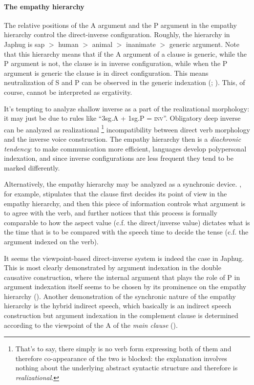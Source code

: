 \documentclass[a4paper, oneside, 12pt]{report}
\newcommand*{\textgt}{$>$ }
\newcommand*{\citesec}[1]{\S~{#1}}
\newcommand{\category}[1]{\textsc{#1}}
\begin{document}
\paragraph*{The empathy hierarchy}\label{sec:grammatical.clause.direct-inverse.hierarchy} 
The relative positions of the A argument and the P argument in the empathy hierarchy
control the direct-inverse configuration.
Roughly, the hierarchy in Japhug is 
\ac{sap} \textgt human \textgt animal \textgt inanimate \textgt generic argument.
Note that this hierarchy means that
if the A argument of a clause is generic,
while the P argument is not,
the clause is in inverse configuration,
while when the P argument is generic the clause is in direct configuration.
This means neutralization of S and P can be observed in the generic indexation
(\citealt{jacques2012argument}; \citealt[\citesec{14.3.2.5}]{jacques2021grammar}).
This, of course, cannot be interpreted as ergativity.

It's tempting to analyze shallow inverse as 
a part of the realizational morphology:
it may just be due to rules like ``3sg.A + 1sg.P = \category{inv}''. 
Obligatory deep inverse can be analyzed as realizational%
\footnote{
    That's to say, there simply is no verb form expressing both of them
    and therefore co-appearance of the two is blocked:
    the explanation involves nothing about the underlying abstract syntactic structure 
    and therefore is \emph{realizational}.
}
incompatibility between
direct verb morphology and the inverse voice construction.
The empathy hierarchy then is a \emph{diachronic tendency}:
to make communication more efficient,
languages develop polypersonal indexation, 
and since inverse configurations are less frequent they tend to be marked differently.

Alternatively, the empathy hierarchy may be analyzed as a synchronic device. 
\citet[\citesec{7.4}]{wiltschko2014universal}, for example,
stipulates that the clause first decides its point of view in the empathy hierarchy,
and then this piece of information controls what argument is to agree with the verb,
and further notices that this process is formally comparable to
how the aspect value (c.f. the direct/inverse value) 
dictates what is the time that is to be compared with the speech time to decide the tense
(c.f. the argument indexed on the verb).

It seems the viewpoint-based direct-inverse system is indeed the case in Japhug. 
This is most clearly demonstrated by argument indexation 
in the double causative construction,
where the internal argument that plays the role of P in argument indexation
itself seems to be chosen by its prominence on the empathy hierarchy
().
Another demonstration of the synchronic nature of the empathy hierarchy
is the hybrid indirect speech,
which basically is an indirect speech construction
but argument indexation in the complement clause is determined
according to the viewpoint of the A of the \emph{main clause}
().
\end{document}
